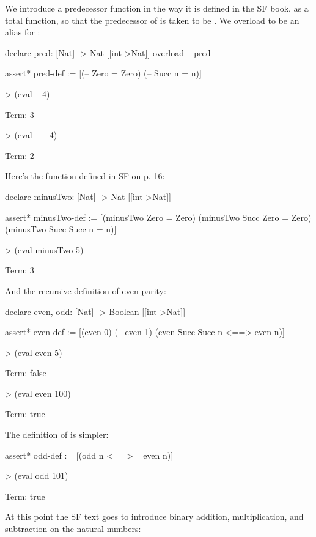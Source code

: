 We introduce a predecessor function  in the way it is defined in the SF book, as a total
function, so that the predecessor of  is taken to be . We overload \smtt{--}
to be an alias for : 
\begin{tcAthena}
declare pred: [Nat] -> Nat [[int->Nat]]
overload -- pred 

assert* pred-def := [(-- Zero = Zero)
                     (-- Succ n = n)]

> (eval -- 4)

Term: 3
 
> (eval -- -- 4)

Term: 2
\end{tcAthena}
Here's the  function defined in SF on p. 16:
\begin{tcAthena}
declare minusTwo: [Nat] -> Nat [[int->Nat]]

assert* minusTwo-def := [(minusTwo Zero = Zero)
                         (minusTwo Succ Zero = Zero)
                         (minusTwo Succ Succ n = n)]

> (eval minusTwo 5)

Term: 3
\end{tcAthena}
And the recursive definition of even parity:
\begin{tcAthena}
declare even, odd: [Nat] -> Boolean [[int->Nat]]

assert* even-def := [(even 0)
                     (~ even 1)
                     (even Succ Succ n <==> even n)]

> (eval even 5)

Term: false

> (eval even 100)

Term: true
\end{tcAthena}
The definition of  is simpler:
\begin{tcAthena}
assert* odd-def := [(odd n <==> ~ even n)]

> (eval odd 101)

Term: true
\end{tcAthena}
At this point the SF text goes to introduce binary addition, multiplication, and subtraction on 
the natural numbers:
